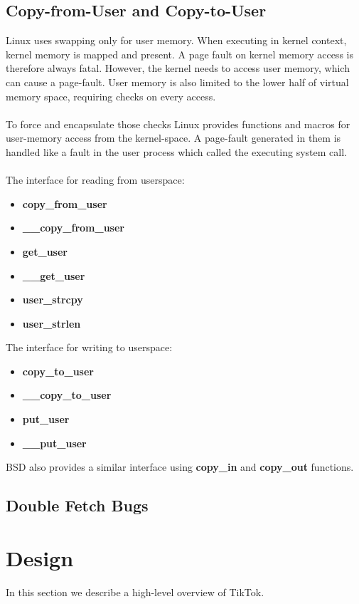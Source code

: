 \documentclass[conference]{IEEEtran}
\begin{document}
\subsection{Copy-from-User and Copy-to-User}
Linux uses swapping only for user memory. When executing in kernel context, kernel memory is mapped and present. A page fault on kernel memory access is therefore always fatal. However, the kernel needs to access user memory, which can cause a page-fault. User memory is also limited to the lower half of virtual memory space, requiring checks on every access.
\\
\\
To force and encapsulate those checks Linux provides functions and macros for user-memory access from the kernel-space. A page-fault generated in them is handled like a fault in the user process which called the executing system call.
\\
\\
The interface for reading from userspace:
\begin{itemize}
    \item \textbf{copy\_from\_user}
    \item \textbf{\_\_copy\_from\_user}
    \item \textbf{get\_user}
    \item \textbf{\_\_get\_user}
    \item \textbf{user\_strcpy}
    \item \textbf{user\_strlen}
\end{itemize}
\bigskip
The interface for writing to userspace:
\begin{itemize}
    \item \textbf{copy\_to\_user}
    \item \textbf{\_\_copy\_to\_user}
    \item \textbf{put\_user}
    \item \textbf{\_\_put\_user}
\end{itemize}
\bigskip
BSD also provides a similar interface using \textbf{copy\_in} and \textbf{copy\_out} functions.

\subsection{Double Fetch Bugs}
\label{sec:doublefetch}

\section{Design}
In this section we describe a high-level overview of TikTok.
\end{document}
